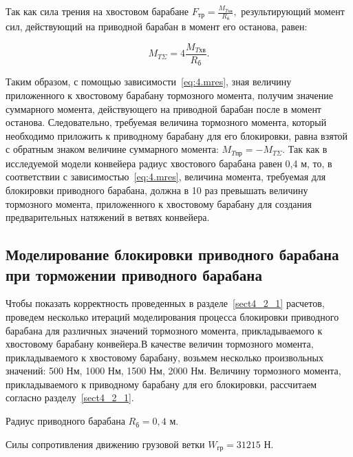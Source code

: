 
Так как сила трения на хвостовом барабане $ F_\text{тр} = \frac{M_{T\text{хв}}}{R_\text{б}}, $ результирующий момент сил, действующий на приводной барабан в момент его останова, равен:

\begin{equation}
\label{eq:4.mres}
M_{T\Sigma} = 4\frac{M_{T\text{хв}}}{R_\text{б}}.
\end{equation}

Таким образом, с помощью зависимости~\ref{eq:4.mres}, зная величину приложенного к хвостовому барабану тормозного момента, получим значение суммарного момента, действующего на приводной барабан после в момент останова. Следовательно, требуемая величина тормозного момента, который необходимо приложить к приводному барабану для его блокировки, равна взятой с обратным знаком величине суммарного момента: $ M_{T\text{пр}} = -M_{T\Sigma}. $ Так как в исследуемой модели конвейера радиус хвостового барабана равен 0,4 м, то, в соответствии с зависимостью~\ref{eq:4.mres}, величина момента, требуемая для блокировки приводного барабана, должна в 10 раз превышать величину тормозного момента, приложенного к хвостовому барабану для создания предварительных натяжений в ветвях конвейера.
\subsection{Моделирование блокировки приводного барабана при торможении приводного барабана} \label{sect4_2_2}

Чтобы показать корректность проведенных в разделе~\ref{sect4_2_1} расчетов, проведем несколько итераций моделирования процесса блокировки приводного барабана для различных значений тормозного момента, прикладываемого к хвостовому барабану конвейера.В качестве величин тормозного момента, прикладываемого к хвостовому барабану, возьмем несколько произвольных значений: 500 Нм, 1000 Нм, 1500 Нм, 2000 Нм. Величину тормозного момента, прикладываемого к приводному барабану для его блокировки, рассчитаем согласно разделу~\ref{sect4_2_1}.

Радиус приводного барабана $ R_\text{б} = 0,4 $ м.

Силы сопротивления движению грузовой ветки  $ W_\text{гр} = 31215 $ Н.

